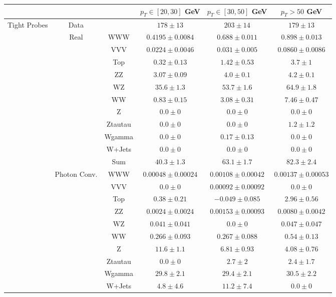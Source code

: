 \small
\begin{tabular}{|c|cc||c|c|c|}
\hline
\multicolumn{3}{|c||}{} & $p_{T}\in[20,30]$ GeV & $p_{T}\in[30,50]$ GeV & $p_{T} > 50$ GeV\\ 
\hline
\hline
\multirow{23}{*}{Tight Probes} &Data & &  $178 \pm 13$ &  $203 \pm 14$ &  $179 \pm 13$\\ 
\cline{2-6}
&\multirow{11}{*}{Real} &WWW &  $0.4195 \pm 0.0084$ &  $0.688 \pm 0.011$ &  $0.898 \pm 0.013$\\ 
&& VVV &  $0.0224 \pm 0.0046$ &  $0.031 \pm 0.005$ &  $0.0860 \pm 0.0086$\\ 
&& Top &  $0.32 \pm 0.13$ &  $1.42 \pm 0.53$ &  $3.7 \pm 1$\\ 
&& ZZ &  $3.07 \pm 0.09$ &  $4.0 \pm 0.1$ &  $4.2 \pm 0.1$\\ 
&& WZ &  $35.6 \pm 1.3$ &  $53.7 \pm 1.6$ &  $64.9 \pm 1.8$\\ 
&& WW &  $0.83 \pm 0.15$ &  $3.08 \pm 0.31$ &  $7.46 \pm 0.47$\\ 
&& Z &  $0.0 \pm 0$ &  $0.0 \pm 0$ &  $0.0 \pm 0$\\ 
&& Ztautau &  $0.0 \pm 0$ &  $0.0 \pm 0$ &  $1.2 \pm 1.2$\\ 
&& Wgamma &  $0.0 \pm 0$ &  $0.17 \pm 0.13$ &  $0.0 \pm 0$\\ 
&& W+Jets &  $0.0 \pm 0$ &  $0.0 \pm 0$ &  $0.0 \pm 0$\\ 
\cline{3-6}
&& Sum &  $40.3 \pm 1.3$ &  $63.1 \pm 1.7$ &  $82.3 \pm 2.4$\\ 
\cline{2-6}
\cline{2-6}
&\multirow{11}{*}{Photon Conv.}& WWW &  $0.00048 \pm 0.00024$ &  $0.00108 \pm 0.00042$ &  $0.00137 \pm 0.00053$\\ 
&& VVV &  $0.0 \pm 0$ &  $0.00092 \pm 0.00092$ &  $0.0 \pm 0$\\ 
&& Top &  $0.38 \pm 0.21$ &  $-0.049 \pm 0.085$ &  $2.96 \pm 0.56$\\ 
&& ZZ &  $0.0024 \pm 0.0024$ &  $0.00153 \pm 0.00093$ &  $0.0080 \pm 0.0042$\\ 
&& WZ &  $0.041 \pm 0.041$ &  $0.0 \pm 0$ &  $0.047 \pm 0.047$\\ 
&& WW &  $0.266 \pm 0.093$ &  $0.267 \pm 0.088$ &  $0.54 \pm 0.13$\\ 
&& Z &  $11.6 \pm 1.1$ &  $6.81 \pm 0.93$ &  $4.08 \pm 0.76$\\ 
&& Ztautau &  $0.0 \pm 0$ &  $2.7 \pm 2$ &  $2.4 \pm 1.7$\\ 
&& Wgamma &  $29.8 \pm 2.1$ &  $29.4 \pm 2.1$ &  $30.5 \pm 2.2$\\ 
&& W+Jets &  $4.8 \pm 4.6$ &  $11.2 \pm 7.4$ &  $0.0 \pm 0$\\ 

\end{tabular}
